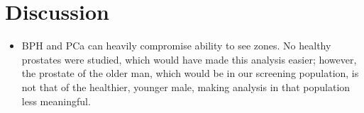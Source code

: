 \section{Discussion}\label{sect:discussion}

\begin{itemize}
    \item BPH and PCa can heavily compromise ability to see zones.  No healthy prostates were studied, which would have made this analysis easier; however, the prostate of the older man, which would be in our screening population, is not that of the healthier, younger male, making analysis in that population less meaningful.
\end{itemize}
